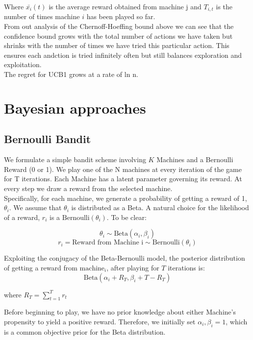 \documentclass{article}
\begin{document}
Where $\bar{x_{i}}(t)$ is the average reward obtained from machine j and $T_{i,t}$ is the number of times machine $i$ has been played so far.\\

From out analysis of the Chernoff-Hoeffing bound above we can see that the confidence bound grows with the total number of actions we have taken but shrinks with the number of times we have tried this particular action. This ensures each andction is tried infinitely often but still balances exploration and exploitation.\\

The regret for UCB1 grows at a rate of ln n.\\

\section{Bayesian approaches}

\subsection{Bernoulli Bandit}

We formulate a simple bandit scheme involving $K$ Machines and a Bernoulli Reward (0 or 1). We play one of the N machines at every iteration of the game for T iterations. Each Machine has a latent parameter governing its reward. At every step we draw a reward from the selected machine.\\

Specifically, for each machine, we generate a probability of getting a reward of 1, $\theta_i$. We assume that $\theta_i$ is distributed as a Beta. A natural choice for the likelihood of a reward, $r_i$ is a $\text{Bernoulli}(\theta_i)$. To be clear:

$$\theta_i \sim \text{Beta}(\alpha_i, \beta_i)$$
$$r_i = \text{Reward from Machine i} \sim \text{Bernoulli}(\theta_i)$$

Exploiting the conjugacy of the Beta-Bernoulli model, the posterior distribution of getting a reward from $\text{machine}_i$, after playing for $T$ iterations is:
$$\text{Beta}(\alpha_i + R_{T}, \beta_i + T - R_{T})$$

where $R_{T} = \sum_{t=1}^{T}r_{t}$

Before beginning to play, we have no prior knowledge about either Machine's propensity to yield a positive reward. Therefore, we initially set $\alpha_i, \beta_i = 1$, which is a common objective prior for the Beta distribution.\\
\end{document}
